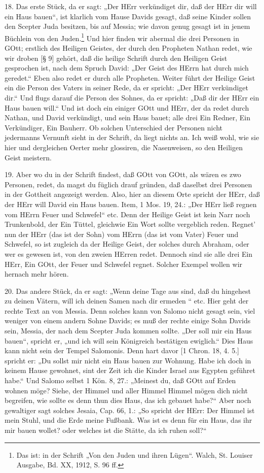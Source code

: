 18. Das erste Stück, da er sagt: „Der HErr verkündiget dir, daß der HErr dir will ein Haus bauen“, ist klarlich vom Hause Davids gesagt, daß seine Kinder sollen den Scepter Juda besitzen, bis auf Messia; wie davon genug gesagt ist in jenem Büchlein von den Juden.\footnote{Das ist: in der Schrift „Von den Juden und ihren Lügen“. Walch, St. Louiser Ausgabe, Bd. XX, 1912, S. 96 ff.} Und hier finden wir abermal die drei Personen in GOtt; erstlich des Heiligen Geistes, der durch den Propheten Nathan redet, wie wir droben [§ 9] gehört, daß die heilige Schrift durch den Heiligen Geist gesprochen ist, nach dem Spruch David: „Der Geist des HErrn hat durch mich geredet.“ Eben also redet er durch alle Propheten. Weiter führt der Heilige Geist ein die Person des Vaters in seiner Rede, da er spricht: „Der HErr verkündiget dir.“ Und flugs darauf die Person des Sohnes, da er spricht: „Daß dir der HErr ein Haus bauen will.“ Und ist doch ein einiger GOtt und HErr, der da redet durch Nathan, und David verkündigt, und sein Haus bauet; alle drei Ein Redner, Ein Verkündiger, Ein Bauherr. Ob solchen Unterschied der Personen nicht jedermanns Vernunft sieht in der Schrift, da liegt nichts an. Ich weiß wohl, wie sie hier und dergleichen Oerter mehr glossiren, die Nasenweisen, so den Heiligen Geist meistern.

19. Aber wo du in der Schrift findest, daß GOtt von GOtt, als wären es zwo Personen, redet, da magst du füglich drauf gründen, daß daselbst drei Personen in der Gottheit angezeigt werden. Also, hier an diesem Orte spricht der HErr, daß der HErr will David ein Haus bauen. Item, 1 Mos. 19, 24.: „Der HErr ließ regnen vom HErrn Feuer und Schwefel“ etc. Denn der Heilige Geist ist kein Narr noch Trunkenbold, der Ein Tüttel, gleichwie Ein Wort sollte vergeblich reden. Regnet' nun der HErr (das ist der Sohn) vom HErrn (das ist vom Vater) Feuer und Schwefel, so ist zugleich da der Heilige Geist, der solches durch Abraham, oder wer es gewesen ist, von den zweien HErren redet. Dennoch sind sie alle drei Ein HErr, Ein GOtt, der Feuer und Schwefel regnet. Solcher Exempel wollen wir hernach mehr hören.

20. Das andere Stück, da er sagt: „Wenn deine Tage aus sind, daß du hingehest zu deinen Vätern, will ich deinen Samen nach dir ermeden
“ etc. Hier geht der rechte Text an von Messia. Denn solches kann von Salomo nicht gesagt sein, viel weniger von einem andern Sohne Davids; es muß der rechte einige Sohn Davids sein, Messia, der nach dem Scepter Juda kommen sollte. „Der soll mir ein Haus bauen“, spricht er, „und ich will sein Königreich bestätigen ewiglich.“ Dies Haus kann nicht sein der Tempel Salomonis. Denn hart davor [1 Chron. 18, 4. 5.] spricht er: „Du sollst mir nicht ein Haus bauen zur Wohnung. Habe ich doch in keinem Hause gewohnet, sint der Zeit ich die Kinder Israel aus Egypten geführet habe.“ Und Salomo selbst 1 Kön. 8, 27.: „Meinest du, daß GOtt auf Erden wohnen möge? Siehe, der Himmel und aller Himmel Himmel mögen dich nicht begreifen, wie sollte es denn thun dies Haus, das ich gebauet habe?“ Aber noch gewaltiger sagt solches Jesaia, Cap. 66, 1.: „So spricht der HErr: Der Himmel ist mein Stuhl, und die Erde meine Fußbank. Was ist es denn für ein Haus, das ihr mir bauen wollet? oder welches ist die Stätte, da ich ruhen soll?“

